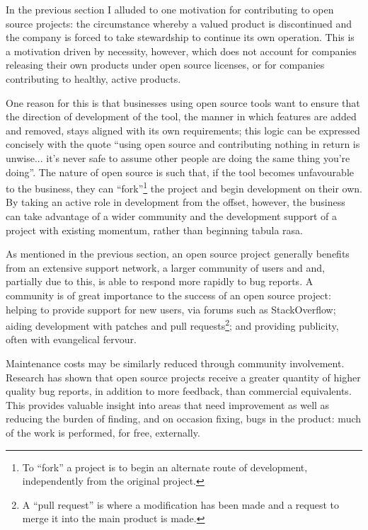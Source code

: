 \documentclass[a4paper]{article}
\begin{document}
In the previous section I alluded to one motivation for contributing to open source projects: the circumstance whereby a valued product is discontinued and the company is forced to take stewardship to continue its own operation. This is a motivation driven by necessity, however, which does not account for companies releasing their own products under open source licenses, or for companies contributing to healthy, active products.

One reason for this is that businesses using open source tools want to ensure that the direction of development of the tool, the manner in which features are added and removed, stays aligned with its own requirements; this logic can be expressed concisely with the quote “using open source and contributing nothing in return is unwise... it’s never safe to assume other people are doing the same thing you’re doing”\cite{feedfish}. The nature of open source is such that, if the tool becomes unfavourable to the business, they can “fork”\footnote{To “fork” a project is to begin an alternate route of development, independently from the original project.} the project and begin development on their own. By taking an active role in development from the offset, however, the business can take advantage of a wider community and the development support of a project with existing momentum, rather than beginning tabula rasa.

As mentioned in the previous section, an open source project generally benefits from an extensive support network, a larger community of users and and, partially due to this, is able to respond more rapidly to bug reports. A community is of great importance to the success of an open source project: helping to provide support for new users, via forums such as StackOverflow\cite{stackoverflow}; aiding development with patches and pull requests\footnote{A “pull request” is where a modification has been made and a request to merge it into the main product is made.}; and providing publicity, often with evangelical fervour\cite{whyemacs}. 

Maintenance costs may be similarly reduced through community involvement. Research has shown that open source projects receive a greater quantity of higher quality bug reports, in addition to more feedback, than commercial equivalents\cite{cio}. This provides valuable insight into areas that need improvement as well as reducing the burden of finding, and on occasion fixing, bugs in the product: much of the work is performed, for free, externally.
\end{document}
